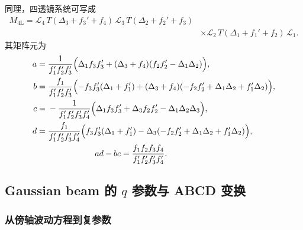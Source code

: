 \begin{example}[title=四薄透镜验证例]
	同理，四透镜系统可写成
	\begin{align*}
		M_{4\mathrm{L}}
		={}\mathcal L_4\,T(\Delta_3+f_3'+f_4)\,
		\mathcal L_3\,T(\Delta_2+f_2'+f_3)\\
		&\times\mathcal L_2\,T(\Delta_1+f_1'+f_2)\,\mathcal L_1.
	\end{align*}
	其矩阵元为
	\begin{align*}
		a={}&\frac{1}{f_1'f_2'f_3'}
		\Bigl(\Delta_1f_3f_3'+(\Delta_3+f_4)(f_2f_2'-\Delta_1\Delta_2)\Bigr),\\
		b={}&\frac{f_1}{f_1'f_2'f_3'}
		\Bigl(-f_3f_3'(\Delta_1+f_1')
		+(\Delta_3+f_4)(-f_2f_2'+\Delta_1\Delta_2+f_1'\Delta_2)\Bigr),\\
		c={}&-\frac{1}{f_1'f_2'f_3'f_4'}
		\Bigl(\Delta_1f_3f_3'+\Delta_3f_2f_2'
		-\Delta_1\Delta_2\Delta_3\Bigr),\\
		d={}&\frac{f_1}{f_1'f_2'f_3'f_4'}
		\Bigl(f_3f_3'(\Delta_1+f_1')
		-\Delta_3(-f_2f_2'+\Delta_1\Delta_2+f_1'\Delta_2)\Bigr),\\
		&\hspace{2cm}
		ad-bc=\frac{f_1f_2f_3f_4}{f_1'f_2'f_3'f_4'}.
	\end{align*}
\end{example}

\subsection{Gaussian beam 的 \(q\) 参数与 ABCD 变换}

\subsubsection{从傍轴波动方程到复参数}


